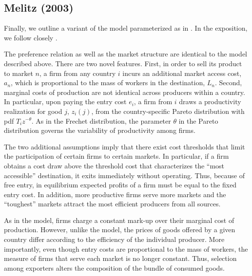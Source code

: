 \documentclass[12pt,dvips, ps2pdf]{article}
\begin{document}
\subsection{Melitz (2003)}

Finally, we outline a variant of the \citet{mel03} model parameterized as in \citet{chaney08}. In the exposition, we follow closely \citet{arkolakisaer}.

The preference relation as well as the market structure are identical to the \citet{krug80} model described above. There are two novel features. First, in order to sell its product to market $n$, a firm from any country $i$ incurs an additional market access cost, $a_n$, which is proportional to the mass of workers in the destination, $L_n$. Second, marginal costs of production are not identical across producers within a country. In particular, upon paying the entry cost $e_i$, a firm from $i$ draws a productivity realization for good $j$, $z_i(j)$, from the country-specific Pareto distribution with pdf $T_iz^{-\theta}$. As in the Frechet distribution, the parameter $\theta$ in the Pareto distribution governs the variability of productivity among firms.

The two additional assumptions imply that there exist cost thresholds that limit the participation of certain firms to certain markets. In particular, if a firm obtains a cost draw above the threshold cost that characterizes the ``most accessible'' destination, it exits immediately without operating. Thus, because of free entry, in equilibrium expected profits of a firm must be equal to the fixed entry cost. In addition, more productive firms serve more markets and the ``toughest'' markets attract the most efficient producers from all sources.

As in the \citet{krug80} model, firms charge a constant mark-up over their marginal cost of production. However, unlike the \citet{krug80} model, the prices of goods offered by a given country differ according to the efficiency of the individual producer. More importantly, even though entry costs are proportional to the mass of workers, the measure of firms that serve each market is no longer constant. Thus, selection among exporters alters the composition of the bundle of consumed goods.
\end{document}
